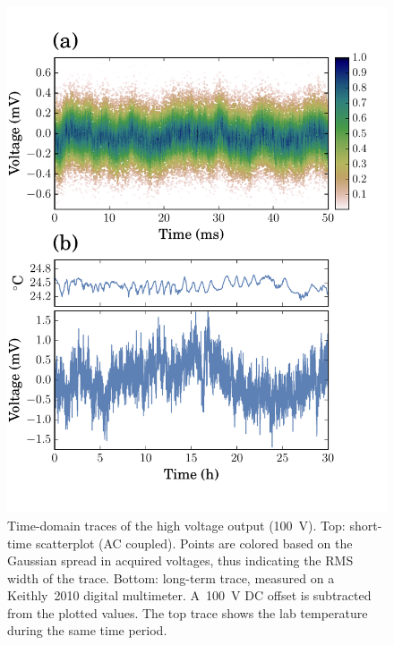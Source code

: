 \documentclass[aip,rsi,reprint]{revtex4-1} %
\begin{document}
\begin{figure}[h]
\includegraphics[width=\columnwidth]{fig/TimeDomain.pdf}
\caption{Time-domain traces of the high voltage output (\SI{100}{\volt}). Top: short-time scatterplot  (AC coupled). Points are colored based on the Gaussian spread in acquired voltages, thus indicating the RMS width of the trace. Bottom: long-term trace, measured on a Keithly~2010 digital multimeter. A~\SI{100}{\volt} DC offset is subtracted from the plotted values. The top trace shows the lab temperature during the same time period.\label{Fig:TimeDomain}}
\end{figure}
\end{document}
